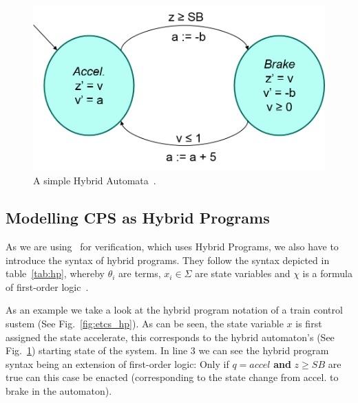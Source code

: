 \begin{figure}[ht!]
	\centering
	\includegraphics[width=1.0\textwidth]{images/automata}
	\caption{A simple Hybrid Automata~\cite{platze2010b}.}
	\label{fig:automata}
\end{figure}

\subsection{Modelling CPS as Hybrid Programs}

As we are using \keym~for verification, which uses Hybrid Programs, we also have to introduce the syntax of hybrid programs. They follow the syntax depicted in table~\ref{tab:hp}, whereby \(\theta_i\) are terms, \(x_i \in \Sigma\) are state variables and \(\chi\) is a formula of first-order logic~\cite{platzer2010b}.

As an example we take a look at the hybrid program notation of a train control sustem (See Fig.~\ref{fig:etcs_hp}). As can be seen, the state variable \(x\) is first assigned the state accelerate, this corresponds to the hybrid automaton's (See Fig.~\ref{fig:automata}) starting state of the system. In line 3 we can see the hybrid program syntax being an extension of first-order logic: Only if \(q=accel\) \textbf{and} \(z \geq SB\) are true can this case be enacted (corresponding to the state change from accel. to brake in the automaton).

